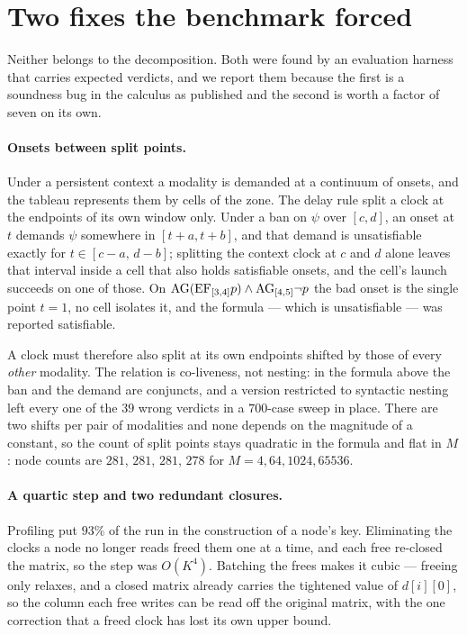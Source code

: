 \section{Two fixes the benchmark forced}
\label{sec:engineering}

Neither belongs to the decomposition. Both were found by an evaluation harness
that carries expected verdicts, and we report them because the first is a
soundness bug in the calculus as published and the second is worth a factor of
seven on its own.

\paragraph{Onsets between split points.} Under a persistent context a modality
is demanded at a continuum of onsets, and the tableau represents them by cells
of the zone. The delay rule split a clock at the endpoints of its own window
only. Under a ban on $\psi$ over $[c,d]$, an onset at $t$ demands $\psi$
somewhere in $[t+a,t+b]$, and that demand is unsatisfiable exactly for
$t\in[c-a,\,d-b]$; splitting the context clock at $c$ and $d$ alone leaves that
interval inside a cell that also holds satisfiable onsets, and the cell's launch
succeeds on one of those. On $\mathrm{AG}(\mathrm{EF}_{[3,4]}p)\wedge\mathrm{AG}_{[4,5]}\neg p$ the bad
onset is the single point $t=1$, no cell isolates it, and the formula --- which
is unsatisfiable --- was reported satisfiable.

A clock must therefore also split at its own endpoints shifted by those of every
\emph{other} modality. The relation is co-liveness, not nesting: in the formula
above the ban and the demand are conjuncts, and a version restricted to
syntactic nesting left every one of the $39$ wrong verdicts in a $700$-case
sweep in place. There are two shifts per pair of modalities and none depends on
the magnitude of a constant, so the count of split points stays quadratic in the
formula and flat in $M$: node counts are $281$, $281$, $281$, $278$ for
$M=4,64,1024,65536$.

\paragraph{A quartic step and two redundant closures.} Profiling put $93\%$ of
the run in the construction of a node's key. Eliminating the clocks a node no
longer reads freed them one at a time, and each free re-closed the matrix, so
the step was $O(K^{4})$. Batching the frees makes it cubic --- freeing only
relaxes, and a closed matrix already carries the tightened value of $d[i][0]$,
so the column each free writes can be read off the original matrix, with the one
correction that a freed clock has lost its own upper bound.

